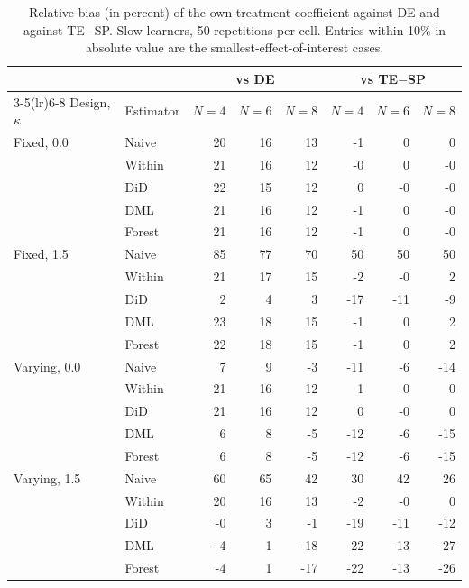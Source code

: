 \documentclass[11pt]{article}
\begin{document}
\begin{table}[t]\centering\small\caption{Relative bias (in percent) of the own-treatment coefficient against DE and against TE$-$SP. Slow learners, 50 repetitions per cell. Entries within 10\% in absolute value are the smallest-effect-of-interest cases.}\label{tab:bias}
\begin{tabular}{llrrrrrr}\toprule & & \multicolumn{3}{c}{vs DE} & \multicolumn{3}{c}{vs TE$-$SP}\\\cmidrule(lr){3-5}\cmidrule(lr){6-8} Design, $\kappa$ & Estimator & $N=4$ & $N=6$ & $N=8$ & $N=4$ & $N=6$ & $N=8$\\\midrule
Fixed, 0.0 & Naive & 20 & 16 & 13 & -1 & 0 & 0\\
 & Within & 21 & 16 & 12 & -0 & 0 & -0\\
 & DiD & 22 & 15 & 12 & 0 & -0 & -0\\
 & DML & 21 & 16 & 12 & -1 & 0 & -0\\
 & Forest & 21 & 16 & 12 & -1 & 0 & -0\\
\midrule
Fixed, 1.5 & Naive & 85 & 77 & 70 & 50 & 50 & 50\\
 & Within & 21 & 17 & 15 & -2 & -0 & 2\\
 & DiD & 2 & 4 & 3 & -17 & -11 & -9\\
 & DML & 23 & 18 & 15 & -1 & 0 & 2\\
 & Forest & 22 & 18 & 15 & -1 & 0 & 2\\
\midrule
Varying, 0.0 & Naive & 7 & 9 & -3 & -11 & -6 & -14\\
 & Within & 21 & 16 & 12 & 1 & -0 & 0\\
 & DiD & 21 & 16 & 12 & 0 & -0 & 0\\
 & DML & 6 & 8 & -5 & -12 & -6 & -15\\
 & Forest & 6 & 8 & -5 & -12 & -6 & -15\\
\midrule
Varying, 1.5 & Naive & 60 & 65 & 42 & 30 & 42 & 26\\
 & Within & 20 & 16 & 13 & -2 & -0 & 0\\
 & DiD & -0 & 3 & -1 & -19 & -11 & -12\\
 & DML & -4 & 1 & -18 & -22 & -13 & -27\\
 & Forest & -4 & 1 & -17 & -22 & -13 & -26\\
\bottomrule\end{tabular}\end{table}
\end{document}
